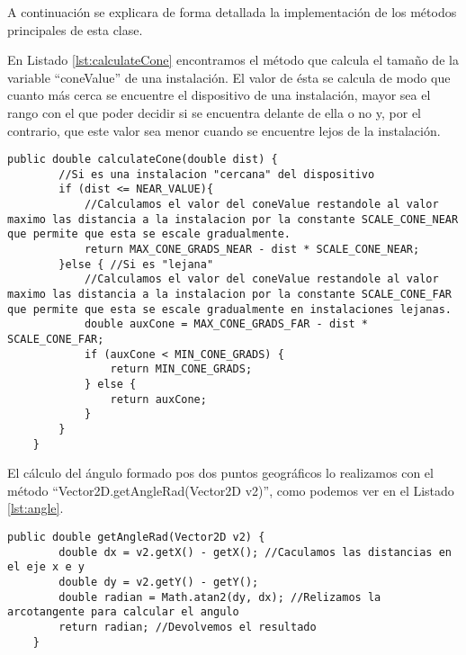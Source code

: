 \bigskip



A continuación se explicara de forma detallada la implementación de los métodos principales de esta clase.

En Listado \ref{lst:calculateCone} encontramos el método que calcula el tamaño de la variable ``coneValue'' de una instalación. El valor de ésta se calcula de modo que cuanto más cerca se encuentre el dispositivo de una instalación, mayor sea el rango con el que poder decidir si se encuentra delante de ella o no y, por el contrario, que este valor sea menor cuando se encuentre lejos de la instalación.
\bigskip
\begin{lstlisting}[caption={Código para calcular el \textit{coneValue} de identificación de cada instalación.}, label={lst:calculateCone}]
    public double calculateCone(double dist) {
        //Si es una instalacion "cercana" del dispositivo
        if (dist <= NEAR_VALUE){
            //Calculamos el valor del coneValue restandole al valor maximo las distancia a la instalacion por la constante SCALE_CONE_NEAR que permite que esta se escale gradualmente.
            return MAX_CONE_GRADS_NEAR - dist * SCALE_CONE_NEAR;
        }else { //Si es "lejana"
            //Calculamos el valor del coneValue restandole al valor maximo las distancia a la instalacion por la constante SCALE_CONE_FAR que permite que esta se escale gradualmente en instalaciones lejanas.
            double auxCone = MAX_CONE_GRADS_FAR - dist * SCALE_CONE_FAR;
            if (auxCone < MIN_CONE_GRADS) {
                return MIN_CONE_GRADS;
            } else {
                return auxCone;
            }
        }
    }
\end{lstlisting}

El cálculo del ángulo formado pos dos puntos geográficos lo realizamos con el método ``Vector2D.getAngleRad(Vector2D v2)'', como podemos ver en el Listado \ref{lst:angle}.

\begin{lstlisting}[caption={Metodo que cálcula el ángulo formado por dos puntos.}, label={lst:angle}]
    public double getAngleRad(Vector2D v2) {
        double dx = v2.getX() - getX(); //Caculamos las distancias en el eje x e y
        double dy = v2.getY() - getY();
        double radian = Math.atan2(dy, dx); //Relizamos la arcotangente para calcular el angulo
        return radian; //Devolvemos el resultado
    }
\end{lstlisting}

